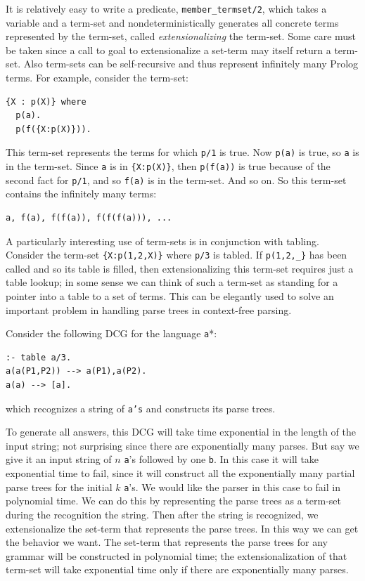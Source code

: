 It is relatively easy to write a predicate, {\tt member\_termset/2},
which takes a variable and a term-set
and non\-deterministically generates all concrete terms represented by
the term-set, called \emph{extensionalizing} the term-set.  Some care
must be taken since a call to goal to extensionalize a set-term may
itself return a term-set.  Also term-sets can be self-recursive and
thus represent infinitely many Prolog terms.  For example, consider
the term-set:
\begin{verbatim}
{X : p(X)} where
  p(a).
  p(f({X:p(X)})).
\end{verbatim}
This term-set represents the terms for which {\tt p/1} is true.  Now
{\tt p(a)} is true, so {\tt a} is in the term-set.  Since {\tt a} is
in \verb|{X:p(X)}|, then {\tt p(f(a))} is true because of the second
fact for {\tt p/1}, and so {\tt f(a)} is in the term-set.  And so on.
So this term-set contains the infinitely many terms:
\begin{verbatim}
a, f(a), f(f(a)), f(f(f(a))), ...
\end{verbatim}

A particularly interesting use of term-sets is in conjunction with
tabling.  Consider the term-set \verb|{X:p(1,2,X)}| where {\tt p/3} is
tabled.  If \verb|p(1,2,_}| has been called and so its table is
filled, then extensionalizing this term-set requires just a table
lookup; in some sense we can think of such a term-set as standing for
a pointer into a table to a set of terms.  This can be elegantly used
to solve an important problem in handling parse trees in context-free
parsing.

Consider the following DCG for the language {\tt a}*:
\begin{verbatim}
:- table a/3.
a(a(P1,P2)) --> a(P1),a(P2).
a(a) --> [a].
\end{verbatim}
which recognizes a string of {\tt a's} and constructs its parse trees.

To generate all answers, this DCG will take time exponential in the
length of the input string; not surprising since there are
exponentially many parses.  But say we give it an input string of $n$
{\tt a}'s followed by one {\tt b}.  In this case it will take
exponential time to fail, since it will construct all the
exponentially many partial parse trees for the initial $k$ {\tt a}'s.
We would like the parser in this case to fail in polynomial time.  We
can do this by representing the parse trees as a term-set during the
recognition the string.  Then after the string is recognized, we
extensionalize the set-term that represents the parse trees.  In this
way we can get the behavior we want.  The set-term that represents the
parse trees for any grammar will be constructed in polynomial time;
the extensionalization of that term-set will take exponential time
only if there are exponentially many parses.

